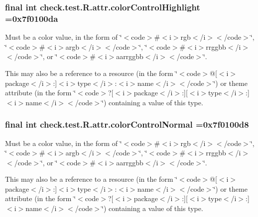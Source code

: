 \subsubsection[{color\+Control\+Highlight}]{\setlength{\rightskip}{0pt plus 5cm}final int check.\+test.\+R.\+attr.\+color\+Control\+Highlight =0x7f0100da\hspace{0.3cm}{\ttfamily [static]}}\label{classcheck_1_1test_1_1_r_1_1attr_a2126d505b83f9a4e9ff11e55eb19ebe8}
Must be a color value, in the form of \char`\"{}$<$code$>$\#$<$i$>$rgb$<$/i$>$$<$/code$>$\char`\"{}, \char`\"{}$<$code$>$\#$<$i$>$argb$<$/i$>$$<$/code$>$\char`\"{}, \char`\"{}$<$code$>$\#$<$i$>$rrggbb$<$/i$>$$<$/code$>$\char`\"{}, or \char`\"{}$<$code$>$\#$<$i$>$aarrggbb$<$/i$>$$<$/code$>$\char`\"{}. 

This may also be a reference to a resource (in the form \char`\"{}$<$code$>$@\mbox{[}$<$i$>$package$<$/i$>$\+:\mbox{]}$<$i$>$type$<$/i$>$\+:$<$i$>$name$<$/i$>$$<$/code$>$\char`\"{}) or theme attribute (in the form \char`\"{}$<$code$>$?\mbox{[}$<$i$>$package$<$/i$>$\+:\mbox{]}\mbox{[}$<$i$>$type$<$/i$>$\+:\mbox{]}$<$i$>$name$<$/i$>$$<$/code$>$\char`\"{}) containing a value of this type. \hypertarget{classcheck_1_1test_1_1_r_1_1attr_aaf758f83271cca56f8236b89bc085b85}{}
\subsubsection[{color\+Control\+Normal}]{\setlength{\rightskip}{0pt plus 5cm}final int check.\+test.\+R.\+attr.\+color\+Control\+Normal =0x7f0100d8\hspace{0.3cm}{\ttfamily [static]}}\label{classcheck_1_1test_1_1_r_1_1attr_aaf758f83271cca56f8236b89bc085b85}
Must be a color value, in the form of \char`\"{}$<$code$>$\#$<$i$>$rgb$<$/i$>$$<$/code$>$\char`\"{}, \char`\"{}$<$code$>$\#$<$i$>$argb$<$/i$>$$<$/code$>$\char`\"{}, \char`\"{}$<$code$>$\#$<$i$>$rrggbb$<$/i$>$$<$/code$>$\char`\"{}, or \char`\"{}$<$code$>$\#$<$i$>$aarrggbb$<$/i$>$$<$/code$>$\char`\"{}. 

This may also be a reference to a resource (in the form \char`\"{}$<$code$>$@\mbox{[}$<$i$>$package$<$/i$>$\+:\mbox{]}$<$i$>$type$<$/i$>$\+:$<$i$>$name$<$/i$>$$<$/code$>$\char`\"{}) or theme attribute (in the form \char`\"{}$<$code$>$?\mbox{[}$<$i$>$package$<$/i$>$\+:\mbox{]}\mbox{[}$<$i$>$type$<$/i$>$\+:\mbox{]}$<$i$>$name$<$/i$>$$<$/code$>$\char`\"{}) containing a value of this type. \hypertarget{classcheck_1_1test_1_1_r_1_1attr_a0b0ddf92c45ba1dc992336304fdcd1f9}{}
